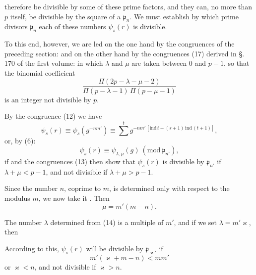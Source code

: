 therefore be divisible by some of these prime factors, and they can, no more than $p$ itself, be divisible by the square of a $\mathfrak{p}_n$. We must establish by which prime divisors $\mathfrak{p}_n$ each of these numbers $\psi_s(r)$ is divisible.

To this end, however, we are led on the one hand by the congruences of the preceding section:
and on the other hand by the congruences (17) derived in \S.\,170 of the first volume:
in which $\lambda$ and $\mu$ are taken between $0$ and $p-1$, so that the binomial coefficient %
\[
\frac{\Pi(2p-\lambda-\mu-2)}{\Pi(p-\lambda-1)\,\Pi(p-\mu-1)}
\]
is an integer not divisible by $p$.

By the congruence (12) we have
\[
\psi_s(r) \equiv \psi_s(g^{-nm'}) \equiv \sum\limits^{t} g^{-nm'\,[\mathrm{ind}\,t - (s+1)\,\mathrm{ind}\,(t+1)]},
\]
or, by (6):
\[
\psi_s(r) \equiv \psi_{\lambda,\mu}(g) \ (\mathrm{mod}\ \mathfrak{p}_{n'}),
\]
if
and the congruences (13) then show that $\psi_s(r)$ is divisible by $\mathfrak{p}_{n'}$ if $\lambda+\mu<p-1$, and not divisible if $\lambda+\mu>p-1$.

Since the number $n$, coprime to $m$, is determined only with respect to the modulus $m$, we now take it . Then
\[
\mu = m'(m-n).
\]

The number $\lambda$ determined from (14) is a multiple of $m'$, and if we set $\lambda = m'\varkappa$, then

According to this, $\psi_s(r)$ will be divisible by $\mathfrak{p}_{\varkappa'}$ if
\[
m'(\varkappa+m-n) < m m'
\]
or $\varkappa < n$, and not divisible if $\varkappa > n$.
